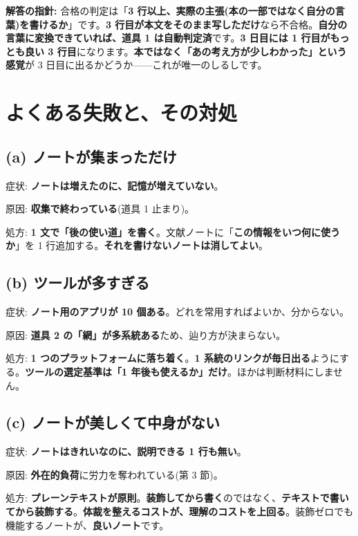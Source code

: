 \documentclass{article}
\begin{document}
\textbf{解答の指針:} 合格の判定は「\textbf{3 行以上、実際の主張(本の一部ではなく自分の言葉)を書けるか}」です。\textbf{3 行目が本文をそのまま写しただけ}なら不合格。\textbf{自分の言葉に変換できていれば、道具 1 は自動判定済}です。\textbf{3 日目には 1 行目がもっとも良い 3 行目}になります。\textbf{本ではなく「あの考え方が少しわかった」という感覚}が 3 日目に出るかどうか——これが唯一のしるしです。

\section{よくある失敗と、その対処}

\subsection{(a) ノートが集まっただけ}

症状: \textbf{ノートは増えたのに、記憶が増えていない}。

原因: \textbf{収集で終わっている}(道具 1 止まり)。

処方: \textbf{1 文で「後の使い道」を書く}。文献ノートに「\textbf{この情報をいつ何に使うか}」を 1 行追加する。\textbf{それを書けないノートは消してよい}。

\subsection{(b) ツールが多すぎる}

症状: \textbf{ノート用のアプリが 10 個ある}。どれを常用すればよいか、分からない。

原因: \textbf{道具 2 の「網」が多系統ある}ため、辿り方が決まらない。

処方: \textbf{1 つのプラットフォームに落ち着く}。\textbf{1 系統のリンクが毎日出る}ようにする。\textbf{ツールの選定基準は「1 年後も使えるか」だけ}。ほかは判断材料にしません。

\subsection{(c) ノートが美しくて中身がない}

症状: \textbf{ノートはきれいなのに、説明できる 1 行も無い}。

原因: \textbf{外在的負荷}に労力を奪われている(第 3 節)。

処方: \textbf{プレーンテキストが原則}。\textbf{装飾してから書く}のではなく、\textbf{テキストで書いてから装飾する}。\textbf{体裁を整えるコストが、理解のコストを上回る}。装飾ゼロでも機能するノートが、\textbf{良いノート}です。
\end{document}
